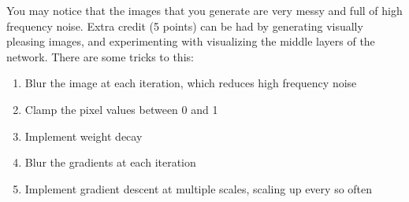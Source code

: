 \documentclass{article}
\begin{document}
You may notice that the images that you generate are very messy and full of
high frequency noise. Extra credit (5 points) can be had by generating visually
pleasing images, and experimenting with visualizing the middle layers of the
network. There are some tricks to this:
\begin{enumerate}
  \item Blur the image at each iteration, which reduces high frequency noise
  \item Clamp the pixel values between 0 and 1
  \item Implement weight decay
  \item Blur the gradients at each iteration
  \item Implement gradient descent at multiple scales, scaling up every so often
\end{enumerate}
\end{document}
